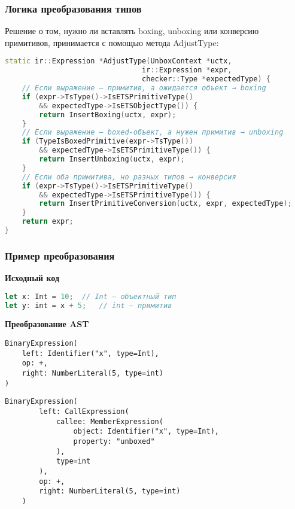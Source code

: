 \subsubsection{Логика преобразования типов}
Решение о том, нужно ли вставлять boxing, unboxing или конверсию примитивов, принимается с помощью метода AdjustType:
\begin{lstlisting}[language=C++,caption=Метод AdjustType]
static ir::Expression *AdjustType(UnboxContext *uctx,
                                ir::Expression *expr,
                                checker::Type *expectedType) {
    // Если выражение — примитив, а ожидается объект → boxing
    if (expr->TsType()->IsETSPrimitiveType()
        && expectedType->IsETSObjectType()) {
        return InsertBoxing(uctx, expr);
    }
    // Если выражение — boxed-объект, а нужен примитив → unboxing
    if (TypeIsBoxedPrimitive(expr->TsType())
        && expectedType->IsETSPrimitiveType()) {
        return InsertUnboxing(uctx, expr);
    }
    // Если оба примитива, но разных типов → конверсия
    if (expr->TsType()->IsETSPrimitiveType()
        && expectedType->IsETSPrimitiveType()) {
        return InsertPrimitiveConversion(uctx, expr, expectedType);
    }
    return expr;
}
\end{lstlisting}

\subsubsection{Пример преобразования}

\textbf{Исходный код}
\begin{lstlisting}[language=TypeScript]
let x: Int = 10;  // Int — объектный тип
let y: int = x + 5;   // int — примитив
\end{lstlisting}

\textbf{Преобразование AST}
\begin{lstlisting}[caption=AST до оптимизации]
BinaryExpression(
    left: Identifier("x", type=Int),
    op: +,
    right: NumberLiteral(5, type=int)
)
\end{lstlisting}


\begin{lstlisting}[caption=AST после оптимизации]
    BinaryExpression(
        left: CallExpression(
            callee: MemberExpression(
                object: Identifier("x", type=Int),
                property: "unboxed"
            ),
            type=int
        ),
        op: +,
        right: NumberLiteral(5, type=int)
    )
\end{lstlisting}


\newpage